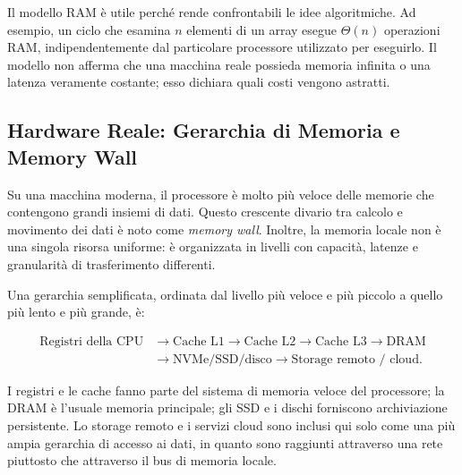 Il modello RAM è utile perché rende confrontabili le idee algoritmiche. Ad esempio, un ciclo che esamina $n$ elementi di un array esegue $\Theta(n)$ operazioni RAM, indipendentemente dal particolare processore utilizzato per eseguirlo. Il modello non afferma che una macchina reale possieda memoria infinita o una latenza veramente costante; esso dichiara quali costi vengono astratti.

\subsection{Hardware Reale: Gerarchia di Memoria e Memory Wall}

Su una macchina moderna, il processore è molto più veloce delle memorie che contengono grandi insiemi di dati. Questo crescente divario tra calcolo e movimento dei dati è noto come \emph{memory wall}. Inoltre, la memoria locale non è una singola risorsa uniforme: è organizzata in livelli con capacità, latenze e granularità di trasferimento differenti.

Una gerarchia semplificata, ordinata dal livello più veloce e più piccolo a quello più lento e più grande, è:

\[
\begin{aligned}
  \text{Registri della CPU}
    &\longrightarrow \text{Cache L1}
    \longrightarrow \text{Cache L2}
    \longrightarrow \text{Cache L3}
    \longrightarrow \text{DRAM} \\
    &\longrightarrow \text{NVMe/SSD/disco}
    \longrightarrow \text{Storage remoto / cloud}.
\end{aligned}
\]

I registri e le cache fanno parte del sistema di memoria veloce del processore; la DRAM è l'usuale memoria principale; gli SSD e i dischi forniscono archiviazione persistente. Lo storage remoto e i servizi cloud sono inclusi qui solo come una più ampia gerarchia di accesso ai dati, in quanto sono raggiunti attraverso una rete piuttosto che attraverso il bus di memoria locale.

